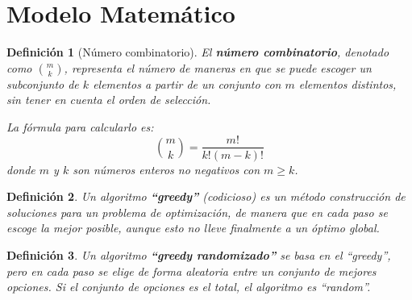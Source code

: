 \documentclass[12pt,a4paper]{book}
\newtheorem{defi}{Definición}[section]
\begin{document}
\section{Modelo Matemático}

\begin{defi}[Número combinatorio]
\label{def:combinatorio}
El \textbf{número combinatorio}, denotado como $\binom{m}{k}$, representa el número de maneras en que se puede escoger un subconjunto de $k$ elementos a partir de un conjunto con $m$ elementos distintos, sin tener en cuenta el orden de selección.

La fórmula para calcularlo es:
$$ \binom{m}{k} = \frac{m!}{k!(m-k)!} $$
donde $m$ y $k$ son números enteros no negativos con $m \ge k$.
\end{defi}

\begin{defi}
Un algoritmo \textbf{``greedy''} (codicioso) es un método construcción de soluciones para un problema de optimización,
de manera que en cada paso se escoge la mejor posible, aunque esto no lleve finalmente a un óptimo global.
\end{defi}

\bigskip

\begin{defi}
Un algoritmo \textbf{``greedy randomizado''} se basa en el ``greedy'', pero en cada paso se elige de forma aleatoria entre un conjunto de mejores opciones.
Si el conjunto de opciones es el total, el algoritmo es ``random''.
\end{defi}

\nocite{*}


\end{document}
